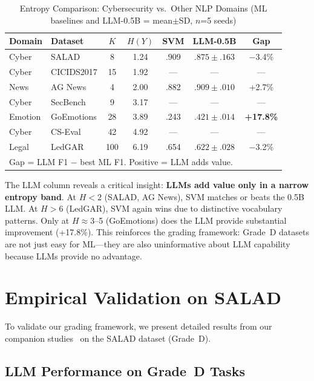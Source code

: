 \documentclass[journal]{IEEEtran}
\begin{document}
\begin{table}[!ht]
\centering
\caption{Entropy Comparison: Cybersecurity vs.\ Other NLP Domains (ML baselines and LLM-0.5B = mean$\pm$SD, $n$=5 seeds)}
\label{tab:crossdomain}
\begin{tabular}{llccccc}
\toprule
\textbf{Domain} & \textbf{Dataset} & $K$ & $H(Y)$ & \textbf{SVM} & \textbf{LLM-0.5B} & \textbf{Gap} \\
\midrule
Cyber & SALAD & 8 & 1.24 & .909 & $.875 \pm .163$ & $-$3.4\% \\
Cyber & CICIDS2017 & 15 & 1.92 & --- & --- & --- \\
News & AG News & 4 & 2.00 & .882 & $.909 \pm .010$ & +2.7\% \\
Cyber & SecBench & 9 & 3.17 & --- & --- & --- \\
Emotion & GoEmotions & 28 & 3.89 & .243 & $.421 \pm .014$ & \textbf{+17.8\%} \\
Cyber & CS-Eval & 42 & 4.92 & --- & --- & --- \\
Legal & LedGAR & 100 & 6.19 & .654 & $.622 \pm .028$ & $-$3.2\% \\
\bottomrule
\multicolumn{7}{l}{\scriptsize Gap = LLM F1 $-$ best ML F1. Positive = LLM adds value.}
\end{tabular}
\end{table}

The LLM column reveals a critical insight: \textbf{LLMs add value only in a narrow entropy band}. At $H < 2$ (SALAD, AG News), SVM matches or beats the 0.5B LLM. At $H > 6$ (LedGAR), SVM again wins due to distinctive vocabulary patterns. Only at $H \approx 3$--5 (GoEmotions) does the LLM provide substantial improvement (+17.8\%). This reinforces the grading framework: Grade~D datasets are not just easy for ML---they are also uninformative about LLM capability because LLMs provide no advantage.

\section{Empirical Validation on SALAD}

To validate our grading framework, we present detailed results from our companion studies~\cite{p3,p6,p22} on the SALAD dataset (Grade~D).

\subsection{LLM Performance on Grade~D Tasks}
\end{document}
